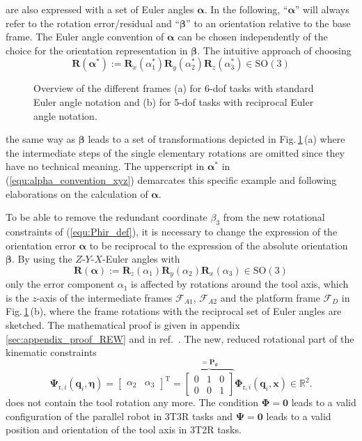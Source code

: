 \documentclass[robotics,article,submit,moreauthors,pdftex]{Definitions/mdpi}
\newcommand{\bm}[1]{\boldsymbol{#1}}
\newcommand{\transp}[0]{{\mathrm{T}}}
\newcommand{\ks}[1]{{\mathcal{F}}_{#1}}
\begin{document}
%
are also expressed with a set of Euler angles $\bm{\alpha}$.
In the following, ``$\bm{\alpha}$'' will always refer to the rotation error/residual and ``$\bm{\beta}$'' to an orientation relative to the base frame.
The Euler angle convention of $\bm{\alpha}$ can be chosen independently of the choice for the orientation representation in  $\bm{\beta}$.
The intuitive approach of choosing
%
\begin{equation}
\bm{R}(\bm{\alpha}^*) := \bm{R}_x(\alpha_1^*) \bm{R}_y(\alpha_2^*) \bm{R}_z(\alpha_3^*) \in \mathrm{SO(3)}
\label{equ:alpha_convention_xyz}
\end{equation}
%
\begin{figure}[tb]
    
    \caption{Overview of the different frames (a) for 6-dof tasks with standard Euler angle notation and (b) for 5-dof tasks with reciprocal Euler angle notation.}
    \label{fig:frames_5dof_6dof}
\end{figure} 
%
%
the same way as $\bm{\beta}$ leads to a set of transformations depicted in Fig.\,\ref{fig:frames_5dof_6dof}\,(a) where the intermediate steps of the single elementary rotations are omitted since they have no technical meaning.
The upperscript in $\bm{\alpha}^*$ in (\ref{equ:alpha_convention_xyz}) demarcates this specific example and following elaborations on the calculation of $\bm{\alpha}$.

To be able to remove the redundant coordinate $\beta_3$ from the new rotational constraints of (\ref{equ:Phir_def}), it is necessary to change the expression of the orientation error $\bm{\alpha}$ to be reciprocal to the expression of the absolute orientation $\bm{\beta}$. By using the $Z$-$Y$-$X$-Euler angles with
%
\begin{equation}
\bm{R}(\bm{\alpha}) := \bm{R}_z(\alpha_1) \bm{R}_y(\alpha_2) \bm{R}_x(\alpha_3) \in \mathrm{SO(3)}
\label{equ:def_rmat_zyxr}
\end{equation}
%
only the error component $\alpha_1$ is affected by rotations around the tool axis, which is the $z$-axis of the intermediate frames $\ks{A1}$, $\ks{A2}$ and the platform frame $\ks{D}$ in Fig.\,\ref{fig:frames_5dof_6dof}\,(b), where the frame rotations with the reciprocal set of Euler angles are sketched.
The mathematical proof is given in appendix\,\ref{sec:appendix_proof_REW} and in ref.\, \cite{1_SchapplerTapOrt2019}.
%
The new, reduced rotational part of the kinematic constraints
%
\begin{equation}
\bm{\Psi}_{\mathrm{r},i}(\bm{q}_i,\bm{\eta}) = 
\begin{bmatrix}
\alpha_2  & \alpha_3
\end{bmatrix}^\transp
=
\overbrace{\begin{bmatrix}
    0 & 1 & 0  \\ 
    0 & 0 & 1
    \end{bmatrix}}^{=\bm{P}_{\Psi}}
\bm{\Phi}_{\mathrm{r},i} (\bm{q}_i,\bm{x})
\in {\mathbb{R}}^{2}.
\label{equ:Psir_def}
\end{equation}
%
does not contain the tool rotation any more.
The condition $\bm{\Phi}=\bm{0}$ leads to a valid configuration of the parallel robot in 3T3R tasks and $\bm{\Psi}=\bm{0}$ leads to a valid position and orientation of the tool axis in 3T2R tasks.
\end{document}
